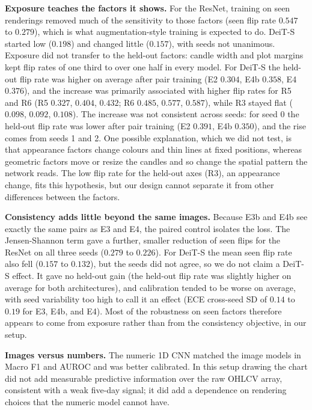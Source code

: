 \documentclass[10pt,journal,compsoc]{IEEEtran}
\begin{document}
\textbf{Exposure teaches the factors it shows.} For the ResNet, training on seen renderings removed much of the sensitivity to those factors (seen flip rate $0.547$ to $0.279$), which is what augmentation-style training \cite{hendrycks2020augmix} is expected to do. DeiT-S started low ($0.198$) and changed little ($0.157$), with seeds not unanimous. Exposure did not transfer to the held-out factors: candle width and plot margins kept flip rates of one third to over one half in every model. For DeiT-S the held-out flip rate was higher on average after pair training (E2 $0.304$, E4b $0.358$, E4 $0.376$), and the increase was primarily associated with higher flip rates for R5 and R6 (R5 $0.327$, $0.404$, $0.432$; R6 $0.485$, $0.577$, $0.587$), while R3 stayed flat ($0.098$, $0.092$, $0.108$). The increase was not consistent across seeds: for seed 0 the held-out flip rate was lower after pair training (E2 $0.391$, E4b $0.350$), and the rise comes from seeds 1 and 2. One possible explanation, which we did not test, is that appearance factors change colours and thin lines at fixed positions, whereas geometric factors move or resize the candles and so change the spatial pattern the network reads. The low flip rate for the held-out axes (R3), an appearance change, fits this hypothesis, but our design cannot separate it from other differences between the factors.

\textbf{Consistency adds little beyond the same images.} Because E3b and E4b see exactly the same pairs as E3 and E4, the paired control isolates the loss. The Jensen-Shannon term \cite{zheng2016stability, hendrycks2020augmix} gave a further, smaller reduction of seen flips for the ResNet on all three seeds ($0.279$ to $0.226$). For DeiT-S the mean seen flip rate also fell ($0.157$ to $0.132$), but the seeds did not agree, so we do not claim a DeiT-S effect. It gave no held-out gain (the held-out flip rate was slightly higher on average for both architectures), and calibration tended to be worse on average, with seed variability too high to call it an effect (ECE cross-seed SD of $0.14$ to $0.19$ for E3, E4b, and E4). Most of the robustness on seen factors therefore appears to come from exposure rather than from the consistency objective, in our setup.

\textbf{Images versus numbers.} The numeric 1D CNN matched the image models in Macro F1 and AUROC and was better calibrated. In this setup drawing the chart did not add measurable predictive information over the raw OHLCV array, consistent with a weak five-day signal; it did add a dependence on rendering choices that the numeric model cannot have.
\end{document}
